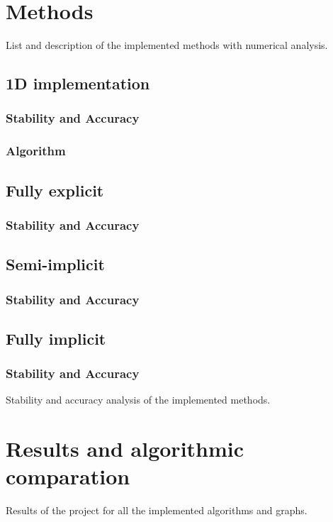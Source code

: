 \documentclass[12pt, letterpaper]{article}
\begin{document}
\section{Methods}
List and description of the implemented methods with numerical analysis.

\subsection{1D implementation}
\subsubsection{Stability and Accuracy}
\subsubsection{Algorithm}

\subsection{Fully explicit}
\subsubsection{Stability and Accuracy}

\subsection{Semi-implicit}
\subsubsection{Stability and Accuracy}

\subsection{Fully implicit}
\subsubsection{Stability and Accuracy}

Stability and accuracy analysis of the implemented methods.

\section{Results and algorithmic comparation}
Results of the project for all the implemented algorithms and graphs.
\end{document}
